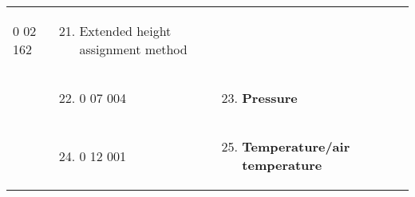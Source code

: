 \begin{longtable}[]{@{}llll@{}}
\begin{minipage}[t]{0.22\columnwidth}
\begin{enumerate}
  0 02 162
\end{enumerate}\strut
\end{minipage} & \begin{minipage}[t]{0.22\columnwidth}\raggedright
\begin{enumerate}
\setcounter{enumi}{20}
\item
  Extended height assignment method
\end{enumerate}\strut
\end{minipage} & \begin{minipage}[t]{0.22\columnwidth}\raggedright
\strut
\end{minipage}\tabularnewline
\begin{minipage}[t]{0.22\columnwidth}\raggedright
\strut
\end{minipage} & \begin{minipage}[t]{0.22\columnwidth}\raggedright
\begin{enumerate}
\setcounter{enumi}{21}
\item
  0 07 004
\end{enumerate}\strut
\end{minipage} & \begin{minipage}[t]{0.22\columnwidth}\raggedright
\begin{enumerate}
\setcounter{enumi}{22}
\item
  \textbf{Pressure}
\end{enumerate}\strut
\end{minipage} & \begin{minipage}[t]{0.22\columnwidth}\raggedright
\strut
\end{minipage}\tabularnewline
\begin{minipage}[t]{0.22\columnwidth}\raggedright
\strut
\end{minipage} & \begin{minipage}[t]{0.22\columnwidth}\raggedright
\begin{enumerate}
\setcounter{enumi}{23}
\item
  0 12 001
\end{enumerate}\strut
\end{minipage} & \begin{minipage}[t]{0.22\columnwidth}\raggedright
\begin{enumerate}
\setcounter{enumi}{24}
\item
  \textbf{Temperature/air temperature}
\end{enumerate}\strut
\end{minipage} & \begin{minipage}[t]{0.22\columnwidth}\raggedright

\end{minipage}
\end{longtable}
